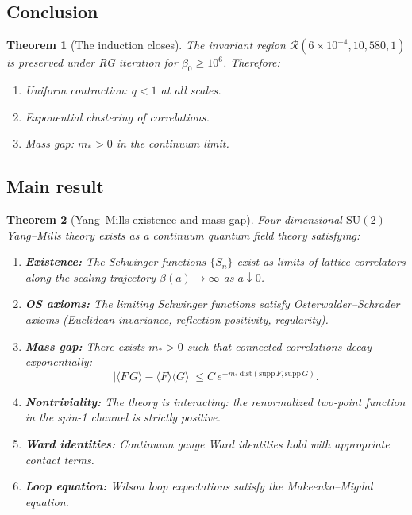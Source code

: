 \documentclass[11pt]{article}
\newtheorem{theorem}{Theorem}[section]
\theoremstyle{definition}
\newcommand{\1}{\mathbf{1}}
\begin{document}
\subsection{Conclusion}

\begin{theorem}[The induction closes]\label{thm:induction-closes}
The invariant region $\mathcal{R}(6\times10^{-4}, 10, 580, 1)$ is preserved under RG iteration 
for $\beta_0 \ge 10^6$. Therefore:
\begin{enumerate}
\item Uniform contraction: $q < 1$ at all scales.
\item Exponential clustering of correlations.
\item Mass gap: $m_* > 0$ in the continuum limit.
\end{enumerate}
\end{theorem}

\subsection{Main result}

\begin{theorem}[Yang--Mills existence and mass gap]\label{thm:main}
Four-dimensional $\mathrm{SU}(2)$ Yang--Mills theory exists as a continuum quantum field theory 
satisfying:
\begin{enumerate}
\item \textbf{Existence:} The Schwinger functions $\{S_n\}$ exist as limits of lattice correlators 
along the scaling trajectory $\beta(a) \to \infty$ as $a \downarrow 0$.
\item \textbf{OS axioms:} The limiting Schwinger functions satisfy Osterwalder--Schrader axioms 
(Euclidean invariance, reflection positivity, regularity).
\item \textbf{Mass gap:} There exists $m_* > 0$ such that connected correlations decay exponentially:
\[
|\langle F \, G \rangle - \langle F \rangle \langle G \rangle| \le C \, e^{-m_* \, \mathrm{dist}(\mathrm{supp}\,F, \mathrm{supp}\,G)}.
\]
\item \textbf{Nontriviality:} The theory is interacting: the renormalized two-point function in 
the spin-1 channel is strictly positive.
\item \textbf{Ward identities:} Continuum gauge Ward identities hold with appropriate contact terms.
\item \textbf{Loop equation:} Wilson loop expectations satisfy the Makeenko--Migdal equation.
\end{enumerate}
\end{theorem}
\end{document}
